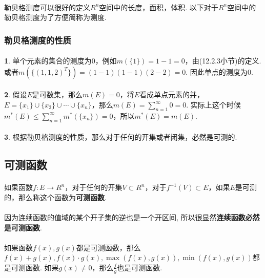 \paragraph{}
勒贝格测度可以很好的定义$R^n$空间中的长度，面积，体积. 以下对于$R^n$空间中的勒贝格测度为了方便简称为测度.

\subsubsection{勒贝格测度的性质}
\paragraph{}
\textbf{1}. 单个元素的集合的测度为$0$，例如$m(\{1\}) = 1 - 1 = 0$，由(12.2.3小节)的定义. 或者$m(\{(1, 1, 2)^T\}) = (1 - 1) (1 - 1) (2 - 2) = 0$. 因此单点的测度为$0$.

\paragraph{}
\textbf{2}. 假设$E$是可数集，那么$m(E) = 0$，将$E$看成单点元素的并，$E = \{x_1\} \cup \{x_2\} \cup \cdots \cup \{x_n\}$，那么$m(E) = \sum_{n=1}^\infty 0 = 0$. 实际上这个时候$m^*(E) \leq \sum_{n=1}^\infty m^*(\{x_n\}) = 0$，所以$m^*(E) = m(E)$.

\paragraph{}
\textbf{3}. 根据勒贝格测度的性质，那么对于任何的开集或者闭集，必然是可测的.

\subsection{可测函数}
\paragraph{}
如果函数$f: E \to R^n$，对于任何的开集$V \subset R^n$，对于$f^{-1}(V) \subset E$，如果$E$是可测的，那么称这个函数为\textbf{可测函数}.

\paragraph{}
因为连续函数的值域的某个开子集的逆也是一个开区间, 所以很显然\textbf{连续函数必然是可测函数}. 

\paragraph{}
如果函数$f(x), g(x)$都是可测函数，那么$f(x) + g(x), f(x) \cdot  g(x), \max(f(x), g(x)), \min(f(x), g(x))$都是可测函数. 如果$g(x) \neq 0$，那么$\frac{f}{g}$也是可测函数. 

